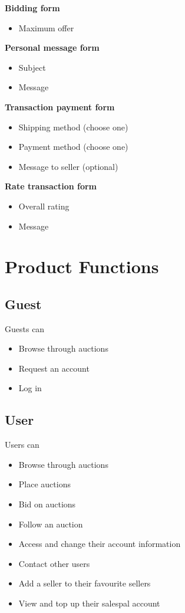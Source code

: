 	\textbf{Bidding form}
		\begin{itemize}
			\item Maximum offer
		\end{itemize}
	\textbf{Personal message form}
		\begin{itemize}
			\item Subject
			\item Message 
		\end{itemize}
	\textbf{Transaction payment form}
		\begin{itemize}
			\item Shipping method (choose one)
			\item Payment method (choose one)
			\item Message to seller (optional) 
		\end{itemize}
	\textbf{Rate transaction form}
		\begin{itemize}
			\item Overall rating
			\item Message 
		\end{itemize}
		
\section{Product Functions}
	\subsection{Guest}
		Guests can
		\begin{itemize}
			\item Browse through auctions
			\item Request an account
			\item Log in
		\end{itemize}
	\subsection{User}
		Users can
		\begin{itemize}
			\item Browse through auctions
			\item Place auctions
			\item Bid on auctions
			\item Follow an auction
			\item Access and change their account information
			\item Contact other users
			\item Add a seller to their favourite sellers
			\item View and top up their salespal account
		\end{itemize}
